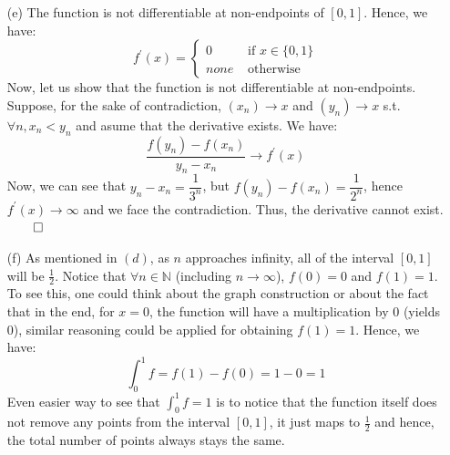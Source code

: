 \documentclass[11pt]{article}
\newcommand{\nats}{\mathbb{N}}
\begin{document}
\begin{itemize}
\begin{itemize}
            \item[(e)]
                The function is not differentiable at non-endpoints of $[0,
                1]$. Hence, we have:
                \begin{equation*}
                    f^\prime(x) = 
                    \begin{cases}
                        0    &\text{ if } x \in \{0, 1\}\\
                        none &\text{ otherwise}
                    \end{cases}
                \end{equation*}
                Now, let us show that the function is not differentiable at
                non-endpoints. Suppose, for the sake of contradiction,
                $(x_n) \to x$ and $(y_n) \to x$ s.t. $\forall n, x_n < y_n$
                and asume that the derivative exists. We have:
                \begin{equation*}
                    \frac{f(y_n) - f(x_n)}{y_n - x_n} \to f^\prime(x)
                \end{equation*}
                Now, we can see that $y_n - x_n = \dfrac{1}{3^n}$, but $f(y_n)
                - f(x_n) = \dfrac{1}{2^n}$, hence $f^\prime(x) \to \infty$ and
                we face the contradiction. Thus, the derivative cannot exist.\\
                $\qed$

            \item[(f)]
                As mentioned in $(d)$, as $n$ approaches infinity, all of the
                interval $[0, 1]$ will be $\frac{1}{2}$. Notice that $\forall n
                \in \nats$ (including $n \to \infty$), $f(0) = 0$ and $f(1) =
                1$. To see this, one could think about the graph construction
                or about the fact that in the end, for $x = 0$, the function
                will have a multiplication by $0$ (yields $0$), similar
                reasoning could be applied for obtaining $f(1) = 1$.
                Hence, we have:
                \begin{equation*}
                    \int_0^1 f = f(1) - f(0) = 1 - 0 = 1
                \end{equation*}
                Even easier way to see that $\int_0^1 f = 1$ is to notice that
                the function itself does not remove any points from the
                interval $[0, 1]$, it just maps to $\frac{1}{2}$ and hence, the
                total number of points always stays the same.
        \end{itemize}
\end{itemize}

\end{document}
